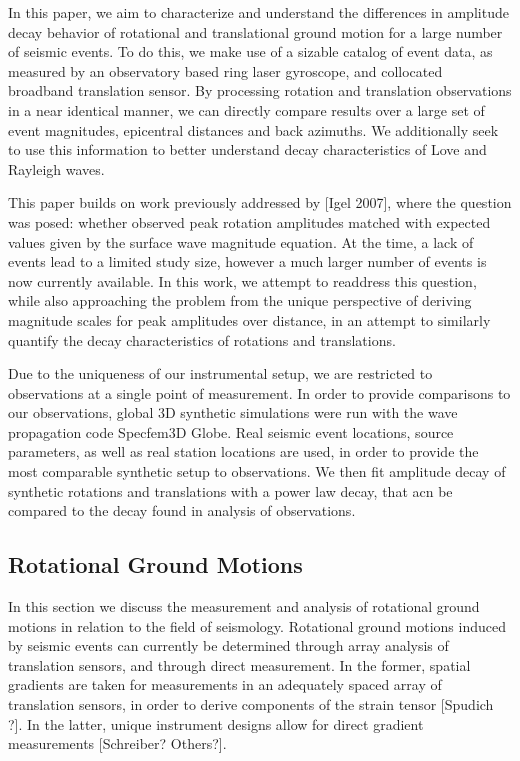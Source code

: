 \documentclass{gji}
\begin{document}
In this paper, we aim to characterize and understand the differences in amplitude decay behavior of rotational and translational ground motion for a large number of seismic events. To do this, we make use of a sizable catalog of event data, as measured by an observatory based ring laser gyroscope, and collocated broadband translation sensor. By processing rotation and translation observations in a near identical manner, we can directly compare results over a large set of event magnitudes, epicentral distances and back azimuths. We additionally seek to use this information to better understand decay characteristics of Love and Rayleigh waves.

This paper builds on work previously addressed by [Igel 2007], %
where the question was posed: whether observed peak rotation amplitudes matched with expected values given by the surface wave magnitude equation. At the time, a lack of events lead to a limited study size, however a much larger number of events is now currently available. In this work, we attempt to readdress this question, while also approaching the problem from the unique perspective of deriving magnitude scales for peak amplitudes over distance, in an attempt to similarly quantify the decay characteristics of rotations and translations.

Due to the uniqueness of our instrumental setup, we are restricted to observations at a single point of measurement. In order to provide comparisons to our observations, global 3D synthetic simulations were run with the wave propagation code Specfem3D Globe. Real seismic event locations, source parameters, as well as real station locations are used, in order to provide the most comparable synthetic setup to  observations. We then fit amplitude decay of synthetic rotations and translations with a power law decay, that acn be compared to the decay found in analysis of observations. 



\subsection{Rotational Ground Motions}
In this section we discuss the measurement and analysis of rotational ground motions in relation to the field of seismology. Rotational ground motions induced by seismic events can currently be determined through array analysis of translation sensors, and through direct measurement. %
In the former, spatial gradients are taken for measurements in an adequately spaced array of translation sensors, in order to derive components of the strain tensor [Spudich ?]. In the latter, unique instrument designs allow for direct gradient measurements [Schreiber? Others?]. %
\end{document}

